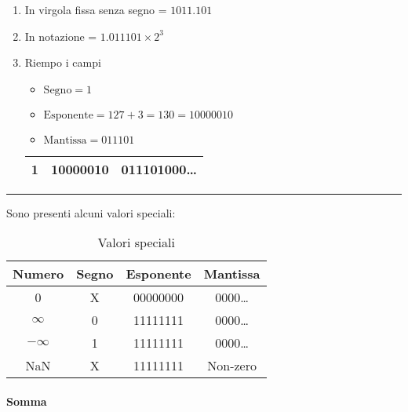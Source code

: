 \documentclass{article}
\begin{document}
\begin{enumerate}
    \item In virgola fissa senza segno = $1011.101$
    \item In notazione = $1.011101\times 2^3$
    \item Riempo i campi
        \begin{itemize}
            \item $\text{Segno} = 1$
            \item $\text{Esponente} = 127+3 = 130 =10000010 $
            \item $\text{Mantissa} = 011101$
        \end{itemize}
    \begin{table}[ht]
        \centering
        \begin{tabular}{|c|c|c|}
            \hline
             \rule{0pt}{1ex}1 & 10000010 & 011101000\ldots \\
             \hline
        \end{tabular}
        \label{tab:example_floatpoint}
    \end{table}
\end{enumerate}

\noindent\rule{\textwidth}{0.5pt}

\vspace{5pt}

\noindent Sono presenti alcuni valori speciali:

\begin{table}[ht]
    \centering
    \begin{tabular}{|c|c|c|c|}
        \hline
        Numero & Segno & Esponente & Mantissa\\
        \hline
        \rule{0pt}{3ex}0 & X & 00000000 & 0000\ldots\\
        \hline
       \rule{0pt}{3ex}$\infty$ & 0 & 11111111 & 0000\ldots\\
        \hline
        \rule{0pt}{3ex}$-\infty$ & 1 & 11111111 & 0000\ldots\\
        \hline
        \rule{0pt}{3ex}NaN & X & 11111111 & Non-zero\\
        \hline
    \end{tabular}
    \caption{Valori speciali}
    \label{tab:floatpoint_special}
\end{table}

\paragraph{Somma}
\end{document}
